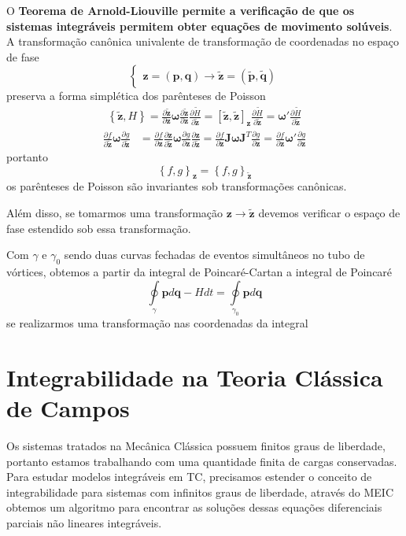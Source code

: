 \documentclass[25pt]{article}
\numberwithin{equation}{subsection} %
\newcommand{\poisson}[2]{\left\{#1,#2\right\}}
\newcommand{\Z}{\tilde{\mathbf{z}}}
\newcommand{\bz}{\mathbf{z}}
\begin{document}
O \textbf{Teorema de Arnold-Liouville permite a verificação de que os sistemas integráveis permitem obter equações de movimento solúveis}.
\bigbreak
A transformação canônica univalente de transformação de coordenadas no espaço de fase $$\begin{cases}
\bz=\left(\mathbf{p},\mathbf{q}\right)\to \Z=\left(\tilde{\mathbf{p}},\tilde{\mathbf{q}}\right)
\end{cases}$$
preserva a forma simplética dos parênteses de Poisson
\begin{align}
	\poisson{\Z}{H}=\frac{\partial \Z}{\partial \bz}\bm{\omega}\frac{\partial \Z}{\partial \bz}\frac{\partial \tilde{H}}{\partial \Z}=\left[\Z,\Z\right]_{\bz}\frac{\partial \tilde{H}}{\partial \Z}=\bm{\omega}'\frac{\partial \tilde{H}}{\partial \Z}
\end{align}
\begin{align}
\frac{\partial f}{\partial \Z}\bm{\omega}\frac{\partial g}{\partial \Z}&=\frac{\partial f}{\partial \bz}\frac{\partial \bz}{\partial \Z}\bm{\omega}\frac{\partial g}{\partial \bz}\frac{\partial \bz}{\partial \Z}=\frac{\partial f}{\partial \bz}\mathbf{J}\bm{\omega}\mathbf{J}^{T}\frac{\partial g}{\partial \bz}=\frac{\partial f}{\partial \bz}\bm{\omega}'\frac{\partial g}{\partial \bz}
\end{align}
portanto
$$\poisson{f}{g}_{\bz}=\poisson{f}{g}_{\Z}$$
os parênteses de Poisson são invariantes sob transformações canônicas.

Além disso, se tomarmos uma transformação $\bz\to\Z$ devemos verificar o espaço de fase estendido sob essa transformação.

Com $\gamma$ e $\gamma_0$ sendo duas curvas fechadas de eventos simultâneos no tubo de vórtices, obtemos a partir da integral de Poincaré-Cartan a integral de Poincaré $$\oint\limits_{\gamma}\mathbf{p}d\mathbf{q}-Hdt=\oint\limits_{\gamma_0}\mathbf{p}d\mathbf{q}$$
se realizarmos uma transformação nas coordenadas da integral

\section{Integrabilidade na Teoria Clássica de Campos}
Os sistemas tratados na Mecânica Clássica possuem finitos graus de liberdade, portanto estamos trabalhando com uma quantidade finita de cargas conservadas. Para estudar modelos integráveis em TC, precisamos estender o conceito de integrabilidade para sistemas com infinitos graus de liberdade, através do MEIC obtemos um algoritmo para encontrar as soluções dessas equações diferenciais parciais não lineares integráveis.
\end{document}
